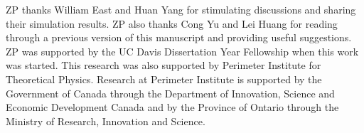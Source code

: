 \documentclass[aps,prd,reprint,nofootinbib, superscriptaddress]{revtex4-1}
\begin{document}
\acknowledgements
ZP thanks William East and Huan Yang for stimulating discussions and sharing their simulation results.
ZP also thanks Cong Yu and Lei Huang for reading through a previous version of this manuscript and providing useful suggestions.
ZP was supported by the UC Davis Dissertation Year Fellowship when this work was started.
This research was also supported by Perimeter Institute for Theoretical Physics.
Research at Perimeter Institute is supported by the Government of Canada
through the Department of Innovation, Science and Economic Development Canada
and by the Province of Ontario through the Ministry of Research, Innovation and Science.




\end{document}
